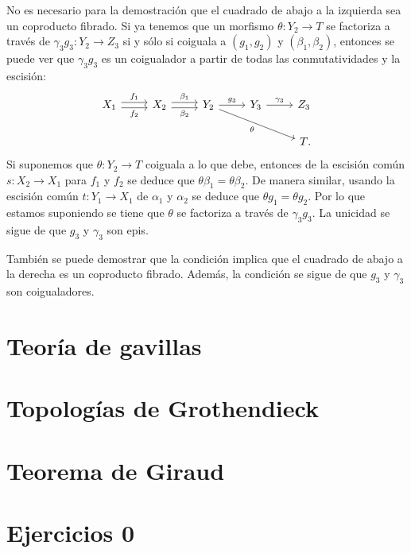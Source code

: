 \begin{comentario}
  No es necesario para la demostración que el cuadrado de abajo a la izquierda
  sea un coproducto fibrado. Si ya tenemos que un morfismo 
  \(\theta\colon Y_2\to T\) se factoriza a través de 
  \(\gamma_3 g_3\colon Y_2\to Z_3\) si y sólo si coiguala a \((g_1, g_2)\) y
  \((\beta_1,\beta_2)\),
  entonces se puede ver que \(\gamma_3g_3\) es un coigualador a partir de todas
  las conmutatividades y la escisión:
  \begin{equation*}
    \begin{tikzcd}[ampersand replacement = \&]
      X_1\ar[shift left]{r}{f_1}\ar[shift right]{r}[swap]{f_2} \&
      X_2 \ar[shift left]{r}{\beta_1}\ar[shift right]{r}[swap]{\beta_2} \&
      Y_2 \ar{r}{g_3}\ar{rrd}[swap]{\theta} \& Y_3\ar{r}{\gamma_3} \& Z_3 \\
      \& \& \& \& T\mathrlap{.}
    \end{tikzcd}
  \end{equation*}
  Si suponemos que \(\theta\colon Y_2\to T\) coiguala a lo que debe, entonces de
  la escisión común \(s\colon X_2\to X_1\) para \(f_1\) y \(f_2\) se deduce que
  \(\theta\beta_1=\theta\beta_2\). De manera similar, usando la escisión común
  \(t\colon Y_1\to X_1\) de \(\alpha_1\) y \(\alpha_2\) se deduce que
  \(\theta g_1=\theta g_2\). Por lo que estamos suponiendo se tiene que
  \(\theta\) se factoriza a través de \(\gamma_3 g_3\). La unicidad se sigue de
  que \(g_3\) y \(\gamma_3\) son epis.

  También se puede demostrar que la condición implica que el cuadrado de abajo a
  la derecha es un coproducto fibrado. Además, la condición se sigue de que
  \(g_3\) y \(\gamma_3\) son coigualadores.
\end{comentario}


\section{Teoría de gavillas}
\label{sec:0.2}

\section{Topologías de Grothendieck}
\label{sec:0.3}

\section{Teorema de Giraud}
\label{sec:0.4}

\section*{Ejercicios 0}
\label{sec:ejercicios-0}
